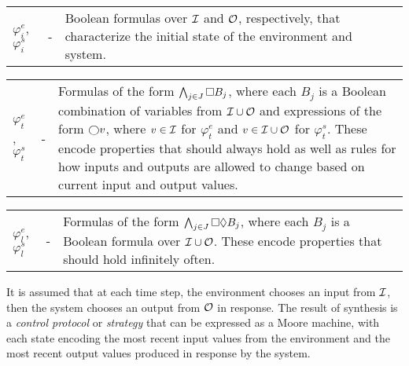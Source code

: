 \documentclass[runningheads]{llncs}
\begin{document}
\vspace{0.5em}

\noindent \begin{xtabular}{p{.045\columnwidth}p{.015\columnwidth}p{.860\columnwidth}}
 $\varphi^e_i$, $\varphi^s_i$ & - & Boolean formulas over $\mathcal{I}$ and $\mathcal{O}$, respectively, that characterize the initial state of the environment and system.
\end{xtabular}

\noindent \begin{xtabular}{p{.045\columnwidth}p{.015\columnwidth}p{.860\columnwidth}}
 $\varphi^e_t$, $\varphi^s_t$ & - &  Formulas of the form $\bigwedge_{j \in J} \square B_j$, where each $B_j$ is a Boolean combination of variables from $\mathcal{I} \cup \mathcal{O}$ and expressions of the form $\varbigcirc v$, where $v \in \mathcal{I}$ for $\varphi^e_t$ and $v \in \mathcal{I} \cup \mathcal{O}$ for $\varphi^s_t$. These encode properties that should always hold as well as rules for how inputs and outputs are allowed to change based on current input and output values.
\end{xtabular}

\noindent \begin{xtabular}{p{.045\columnwidth}p{.015\columnwidth}p{.860\columnwidth}}
$\varphi^e_l$, $\varphi^s_l$ & - & Formulas of the form $\bigwedge_{j \in J} \square \lozenge B_j$, where each $B_j$ is a Boolean formula over $\mathcal{I} \cup \mathcal{O}$. These encode properties that should hold infinitely often.
\end{xtabular}

\vspace{0.5em}

\noindent It is assumed that at each time step, the environment chooses an input from $\mathcal{I}$, then the system chooses an output from $\mathcal{O}$ in response. 
The result of synthesis is a \emph{control protocol} or \emph{strategy} that can be expressed as a Moore machine, 
with each state encoding the most recent input values from the environment and the most recent output values produced in response by the system.
\end{document}
